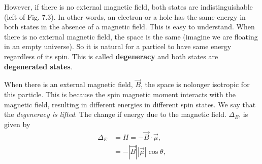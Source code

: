 \documentclass{article}
\begin{document}
However, if there is no external magnetic field, both states are indistinguishable
(left of Fig. 7.3). In other words, an electron or a hole has the same energy in both states
in the absence of a magnetic field. This is easy to understand. When there is no external magnetic field, 
the space is the same (imagine we are floating in an empty universe). So it is natural for a particel to have
same energy regardless of its spin. This is called \textbf{degeneracy} and both states
are \textbf{degenerated states}.

When there is an external magnetic field, $\vec{B}$, the space is nolonger isotropic for this
particle. This is because the spin magnetic moment interacts with the magnetic field,
resulting in different energies in different spin states. We say that the \textit{degeneracy is lifted}.
The change if energy due to the magnetic field. $\Delta_E$, is given by 
\begin{align*}\label{eq 7.10}
    \Delta_E&=H=-\vec{B}\cdot\vec{\mu},\\
    &=-|\vec{B}||\vec{\mu}|\cos{\theta},\tag{7.10}
\end{align*}
\end{document}
